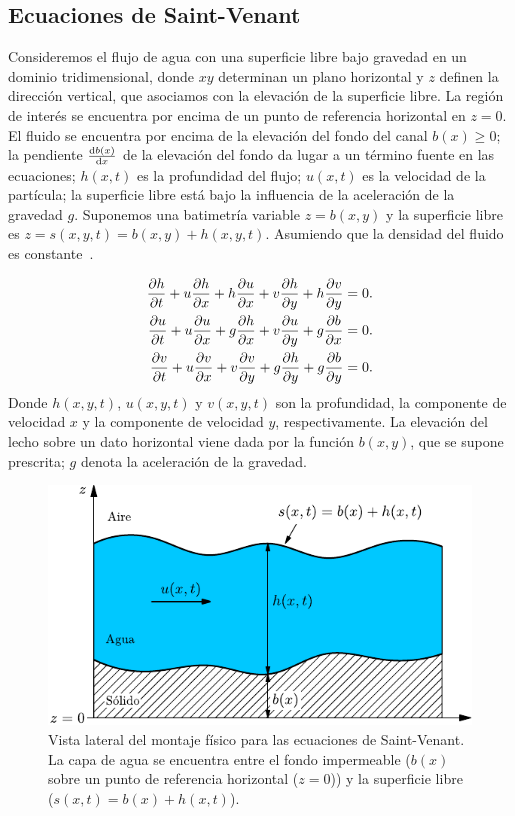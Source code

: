 \subsection*{Ecuaciones de Saint-Venant}

Consideremos el flujo de agua con una superficie libre bajo gravedad
en un dominio tridimensional, donde $xy$ determinan un plano
horizontal y $z$ definen la dirección vertical, que asociamos con la
elevación de la superficie libre.
La región de interés se encuentra por encima de un punto de
referencia horizontal en $z=0$.
El fluido se encuentra por encima de la elevación del fondo del canal
$b\left(x\right)\geq 0$; la pendiente $\diff{b\left(x\right)}{x}$ de
la elevación del fondo da lugar a un término fuente en las
ecuaciones; $h\left(x,t\right)$ es la profundidad del flujo;
$u\left(x,t\right)$ es la velocidad de la partícula; la superficie
libre está bajo la influencia de la aceleración de la gravedad $g$.
Suponemos una batimetría variable $z=b\left(x,y\right)$ y la
superficie libre es
\begin{math}
	z=
	s\left(x,y,t\right)=
	b\left(x,y\right)+
	h\left(x,y,t\right)
\end{math}.
Asumiendo que la densidad del fluido es constante~\cite{Toro2024}.

\begin{align*}
	\diffp{h}{t}+
	u\diffp{h}{x}+
	h\diffp{u}{x}+
	v\diffp{h}{y}+
	h\diffp{v}{y} & =0. \\
	\diffp{u}{t}+
	u\diffp{u}{x}+
	g\diffp{h}{x}+
	v\diffp{u}{y}+
	g\diffp{b}{x} & =
	0.                  \\
	\diffp{v}{t}+
	u\diffp{v}{x}+
	v\diffp{v}{y}+
	g\diffp{h}{y}+
	g\diffp{b}{y} & =
	0.
\end{align*}
Donde $h\left(x,y,t\right)$, $u\left(x,y,t\right)$ y
$v\left(x,y,t\right)$ son la profundidad, la componente de velocidad
$x$ y la componente de velocidad $y$, respectivamente.
La elevación del lecho sobre un dato horizontal viene dada por la
función $b\left(x,y\right)$, que se supone prescrita; $g$ denota la
aceleración de la gravedad.

\begin{figure}[b]
	\sidecaption[t]
	\includegraphics{saintvenant}
	\caption{Vista lateral del montaje físico para las ecuaciones de Saint-Venant.
		La capa de agua se encuentra entre el fondo impermeable ($b(x)$ sobre
		un punto de referencia horizontal ($z=0$)) y la superficie libre
		($s(x,t)=b(x)+h(x,t)$).}
	\label{fig:2}
\end{figure}

